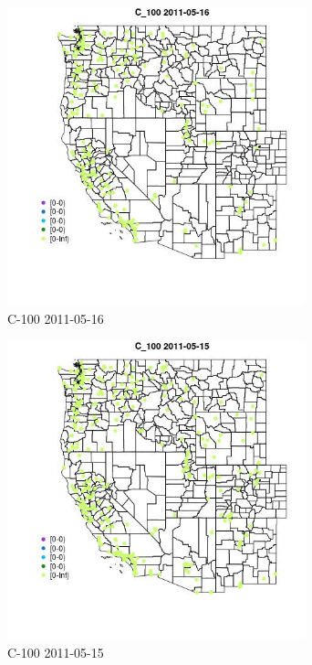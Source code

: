 \begin{figure} 
\centering  
\includegraphics[width=0.77\textwidth]{Code_Outputs/ML_input_report_ML_input_PM25_Step5_part_d_de_duplicated_aves_ML_input_MapObsC_1002011-05-16.jpg} 
\caption{\label{fig:ML_input_report_ML_input_PM25_Step5_part_d_de_duplicated_aves_ML_inputMapObsC_1002011-05-16}C-100 2011-05-16} 
\end{figure} 
 

\begin{figure} 
\centering  
\includegraphics[width=0.77\textwidth]{Code_Outputs/ML_input_report_ML_input_PM25_Step5_part_d_de_duplicated_aves_ML_input_MapObsC_1002011-05-15.jpg} 
\caption{\label{fig:ML_input_report_ML_input_PM25_Step5_part_d_de_duplicated_aves_ML_inputMapObsC_1002011-05-15}C-100 2011-05-15} 
\end{figure} 
 


